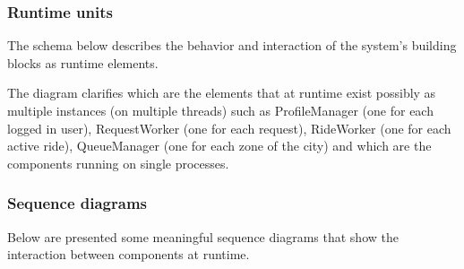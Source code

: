 \documentclass[a4paper,11pt]{report} %
\begin{document}
	\subsubsection{Runtime units}
	The schema below describes the behavior and interaction of the system's building blocks as runtime elements.\\
	\begin{minipage}{\linewidth}
	\end{minipage}
	The diagram clarifies which are the elements that at runtime exist possibly as multiple instances (on multiple threads) such as ProfileManager (one for each logged in user), RequestWorker (one for each request), RideWorker (one for each active ride), QueueManager (one for each zone of the city) and which are the components running on single processes.
	
	\pagebreak
	\subsubsection{Sequence diagrams}
	Below are presented some meaningful sequence diagrams that show the interaction between components at runtime.
\end{document}

